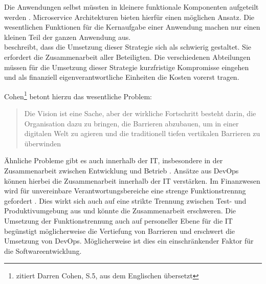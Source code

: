Die Anwendungen selbst müssten in kleinere funktionale Komponenten aufgeteilt werden \cite{Bussmann2006}. Microservice Architekturen bieten hierfür einen möglichen Ansatz. Die wesentlichen Funktionen für die Kernaufgabe einer Anwendung machen nur einen kleinen Teil der ganzen Anwendung aus.
\medskip
\\
\citet{Gupta:2017} beschreibt, dass die Umsetzung dieser Strategie sich als schwierig gestaltet. Sie erfordert die Zusammenarbeit aller Beteiligten. Die verschiedenen Abteilungen müssen für die Umsetzung dieser Strategie kurzfristige Kompromisse eingehen und als finanziell eigenverantwortliche Einheiten die Kosten vorerst tragen. 

Cohen\footnote{\citet{Gupta:2017} zitiert Darren Cohen, S.5, aus dem Englischen übersetzt} betont hierzu das wesentliche Problem:
\begin{quote}\label{quote:goldman-vision}
    Die Vision ist eine Sache, aber der wirkliche Fortschritt besteht darin, die Organisation dazu zu bringen, die Barrieren abzubauen, um in einer digitalen Welt zu agieren und die traditionell tiefen vertikalen Barrieren zu überwinden
\end{quote}
\medskip
Ähnliche Probleme gibt es auch innerhalb der IT, insbesondere in der Zusammenarbeit zwischen Entwicklung und Betrieb \citet{Disterer2013}. Ansätze aus DevOps \cite{Alt2017} können hierbei die Zusammenarbeit innerhalb der IT verstärken. Im Finanzwesen wird für unvereinbare Verantwortungsbereiche eine strenge Funktionstrennng gefordert \cite{MaRisk:2017}.
Dies wirkt sich auch auf eine strikte Trennung zwischen Test- und Produktivumgebung aus \citet{MaRisk:2017} und könnte die Zusammenarbeit erschweren. Die Umsetzung der Funktionstrennung auch auf personeller Ebene für die IT begünstigt möglicherweise die Vertiefung von Barrieren und erschwert die Umsetzung von DevOps. Möglicherweise ist dies ein einschränkender Faktor für die Softwareentwicklung.

